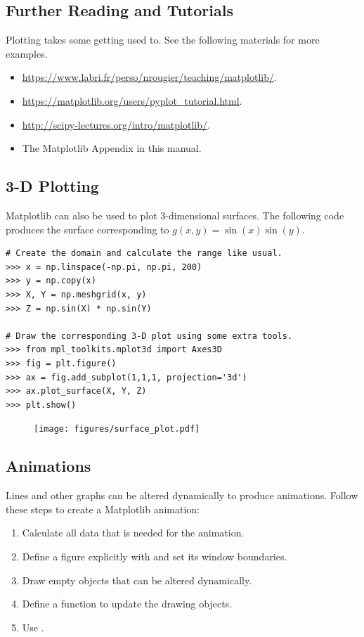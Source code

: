 \subsection*{Further Reading and Tutorials} %

Plotting takes some getting used to.
See the following materials for more examples.
\begin{itemize}
    \item \url{https://www.labri.fr/perso/nrougier/teaching/matplotlib/}.
    \item \url{https://matplotlib.org/users/pyplot_tutorial.html}.
    \item \url{http://scipy-lectures.org/intro/matplotlib/}.
    \item The Matplotlib Appendix in this manual.
\end{itemize}

\subsection*{3-D Plotting} %

Matplotlib can also be used to plot 3-dimensional surfaces.
The following code produces the surface corresponding to $g(x,y) = \sin(x)\sin(y)$.

\begin{lstlisting}
# Create the domain and calculate the range like usual.
>>> x = np.linspace(-np.pi, np.pi, 200)
>>> y = np.copy(x)
>>> X, Y = np.meshgrid(x, y)
>>> Z = np.sin(X) * np.sin(Y)

# Draw the corresponding 3-D plot using some extra tools.
>>> from mpl_toolkits.mplot3d import Axes3D
>>> fig = plt.figure()
>>> ax = fig.add_subplot(1,1,1, projection='3d')
>>> ax.plot_surface(X, Y, Z)
>>> plt.show()
\end{lstlisting}

\begin{figure}[H]
    \texttt{[image: figures/surface\_plot.pdf]}
\end{figure}

\subsection*{Animations} %

Lines and other graphs can be altered dynamically to produce animations.
Follow these steps to create a Matplotlib animation:
%
\begin{enumerate}
    \item Calculate all data that is needed for the animation.
    \item Define a figure explicitly with  and set its window boundaries.
    \item Draw empty objects that can be altered dynamically.
    \item Define a function to update the drawing objects.
    \item Use .
\end{enumerate}

